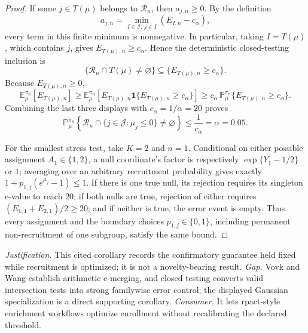 \documentclass{article}
\begin{document}
\begin{proof}
If some \(j\in T(\mu)\) belongs to \(\mathcal R_n\), then \(a_{j,n}\geq0\).  By the definition
\[
a_{j,n}=\min_{I\in\mathcal I:\,j\in I}(E_{I,n}-c_\alpha),
\]
every term in this finite minimum is nonnegative.  In particular, taking \(I=T(\mu)\), which contains \(j\), gives \(E_{T(\mu),n}\geq c_\alpha\).  Hence the deterministic closed-testing inclusion is
\[
\{\mathcal R_n\cap T(\mu)\neq\varnothing\}
\subseteq\{E_{T(\mu),n}\geq c_\alpha\}.
\]
Because \(E_{T(\mu),n}\geq0\),
\[
\mathbb E_\mu^{\pi_n}[E_{T(\mu),n}]
\geq
\mathbb E_\mu^{\pi_n}\!\left[E_{T(\mu),n}
 \mathbf 1\{E_{T(\mu),n}\geq c_\alpha\}\right]
\geq c_\alpha\,
\mathbb P_\mu^{\pi_n}\{E_{T(\mu),n}\geq c_\alpha\}.
\]
Combining the last three displays with \(c_\alpha=1/\alpha=20\) proves
\[
\mathbb P_\mu^{\pi_n}\!\left\{
 \mathcal R_n\cap\{j\in\mathcal J:\mu_j\leq0\}\neq\varnothing
\right\}
\leq \frac{1}{c_\alpha}=\alpha=0.05.
\]

For the smallest stress test, take \(K=2\) and \(n=1\).  Conditional on either possible assignment \(A_1\in\{1,2\}\), a null coordinate's factor is respectively \(\exp\{Y_1-1/2\}\) or \(1\); averaging over an arbitrary recruitment probability gives exactly \(1+p_{1,j}(e^{\mu_j}-1)\leq1\).  If there is one true null, its rejection requires its singleton e-value to reach \(20\); if both nulls are true, rejection of either requires \((E_{1,1}+E_{2,1})/2\geq20\); and if neither is true, the error event is empty.  Thus every assignment and the boundary choices \(p_{1,j}\in\{0,1\}\), including permanent non-recruitment of one subgroup, satisfy the same bound.
\end{proof}
\par\smallskip\noindent \textit{Justification.} This cited corollary records the confirmatory guarantee held fixed while recruitment is optimized; it is not a novelty-bearing result. \textit{Gap.} Vovk and Wang establish arithmetic e-merging, and closed testing converts valid intersection tests into strong familywise error control; the displayed Gaussian specialization is a direct supporting corollary. \textit{Consumer.} It lets rpact-style enrichment workflows optimize enrollment without recalibrating the declared threshold.
\end{document}
